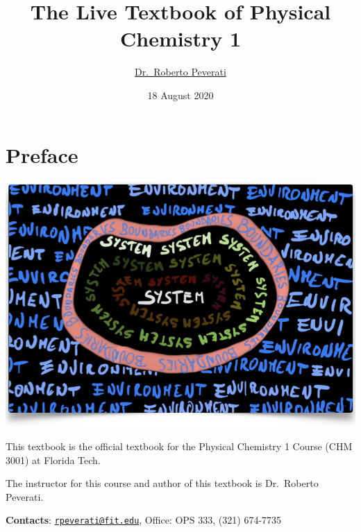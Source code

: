 \documentclass[
  9pt,
]{extbook}
\title{The Live Textbook of Physical Chemistry 1}
\author{\href{mailto:rpeverati@fit.edu}{Dr.~Roberto Peverati}}
\date{18 August 2020}
\let\oldmaketitle\maketitle
\theoremstyle{definition}
\theoremstyle{definition}
\theoremstyle{definition}
\theoremstyle{remark}
\begin{document}
\maketitle


%
\newpage

\let\maketitle\oldmaketitle

\renewcommand\thepage{\romannumeral\numexpr\value{page}-1\relax}


{
\setcounter{tocdepth}{1}
\tableofcontents
}
\renewcommand{\arraystretch}{1.8}

\hypertarget{preface}{%
\chapter*{Preface}\label{preface}}

\begin{center}\includegraphics[width=0.8\linewidth]{./img/OEP_Figures.000} \end{center}

This textbook is the official textbook for the Physical Chemistry 1 Course (CHM 3001) at Florida Tech.

The instructor for this course and author of this textbook is Dr.~Roberto Peverati.

\textbf{Contacts}: \href{mailto:rpeverati@fit.edu}{\nolinkurl{rpeverati@fit.edu}}, Office: OPS 333, (321) 674-7735
\end{document}
